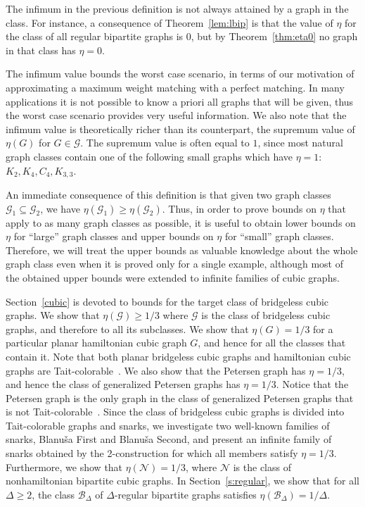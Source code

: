 \documentclass{article}
\newcommand{\GG}{\mathcal{G}}
\newcommand{\BB}{\mathcal{B}}
\newcommand{\NN}{\mathcal{N}}
\begin{document}
The infimum in the previous definition is not always attained by a graph in the class. For instance, a consequence of Theorem~\ref{lem:lbip} is that the value of $\eta$ for the class of all regular bipartite graphs is $0$, but by Theorem~\ref{thm:eta0} no graph in that class has $\eta = 0$.

The infimum value bounds the worst case scenario, in terms of our motivation of approximating a maximum weight matching with a perfect matching. In many applications it is not possible to know a priori all graphs that will be given, thus the worst case scenario provides very useful information.  We also note that the infimum value is theoretically richer than its counterpart, the supremum value of $\eta(G)$ for $G \in \GG$. The supremum value is often equal to $1$, since most natural graph classes contain one of the following small graphs which have $\eta = 1$: $K_2,K_4,C_4, K_{3,3}$.

An immediate consequence of this definition is that given two graph classes $\GG_1 \subseteq \GG_2$, we have $\eta(\GG_1) \geq \eta(\GG_2)$. 
Thus, in order to prove bounds on $\eta$ that apply to as many graph classes as possible, it is useful to obtain lower bounds on $\eta$ for ``large'' graph classes and upper bounds on $\eta$ for ``small'' graph classes. 
Therefore, we will treat the upper bounds as valuable knowledge about the whole graph class even when it is proved only for a single example, although most of the obtained upper bounds were extended to infinite families of cubic graphs.

Section~\ref{cubic} is devoted to bounds for the target class of bridgeless
cubic graphs. We show that $\eta(\GG) \geq 1/3$ where $\GG$ is the class of bridgeless cubic graphs, and therefore to all its subclasses.
We show that $\eta(G) = 1/3$ for a particular planar hamiltonian cubic graph $G$, and hence for all the classes that contain it. 
Note that both planar  bridgeless cubic graphs and hamiltonian cubic graphs are Tait-colorable~\cite{bm}. 
We also show that the Petersen graph has $\eta = 1/3$, and hence the class of generalized Petersen graphs has $\eta = 1/3$. Notice that the Petersen graph is the only graph in the class of generalized Petersen graphs that is not Tait-colorable~\cite{Castagna1972}. Since the class of bridgeless cubic graphs is divided into Tait-colorable graphs and snarks, we investigate two well-known families of snarks, Blanu\v{s}a First and Blanu\v{s}a Second, and present an infinite family of snarks obtained by the 2-construction for which all members satisfy $\eta = 1/3$. Furthermore, we show that $\eta(\NN) = 1/3$, where $\NN$ is the class of nonhamiltonian bipartite cubic graphs.
In Section~\ref{s:regular}, we show that for all $\Delta \geq 2$, the class $\BB_\Delta$ of $\Delta$-regular bipartite graphs satisfies $\eta(\BB_\Delta) = 1/\Delta$. 
\end{document}
